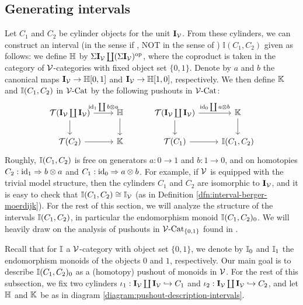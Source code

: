 \documentclass[12pt]{amsart}
\begin{document}
\subsection{Generating intervals}
Let $C_1$ and $C_2$ be cylinder objects for the unit $\mathbf{I}_\mathcal{V}$. From these cylinders, we can construct an interval (in the sense if \cite{Muro2012}, NOT in the sense of \cite{BergerMoerdijk2012}) $\mathbb{I}(C_1,C_2)$ given as follows:
we define $\mathbb{H}$ by $\Sigma\mathbf{I}_\mathcal{V} \coprod (\Sigma\mathbf{I}_\mathcal{V})^{\text{op}}$, where the coproduct is taken in the category of $\mathcal{V}$-categories with fixed object set $\{0,1\}$.
Denote by $a$ and $b$ the canonical maps $\mathbf{I}_\mathcal{V} \to \mathbb{H}[0,1] $ and $\mathbf{I}_\mathcal{V} \to \mathbb{H}[1,0]$, respectively.
We then define $\mathbb{K}$ and $\mathbb{I}(C_1,C_2)$ in $\mathcal{V}\text{-}\mathrm{Cat}$ by the following pushouts in $\mathcal{V}\text{-}\mathrm{Cat}$:
\begin{equation}\label{diagram:pushout-description-intervals}
\begin{tikzcd}
	\T(\iv \coprod \iv) \ar[d] \ar[r, "\id_1 \coprod b\otimes a"]
		& \H \ar[d]
	\\
	\T(C_2) \ar[r]
		& \K
\end{tikzcd}
\quad \quad \quad 
\begin{tikzcd}
	\T(\iv \coprod \iv) \ar[d] \ar[r, "\id_0 \coprod a\otimes b "]
		& \K \ar[d]
	\\
	\T(C_1) \ar[r]
		& \I(C_1,C_2)
\end{tikzcd}
\end{equation}
Roughly, $\mathbb{I}(C_1,C_2)$ is free on generators $a: 0 \to 1$ and $b: 1 \to 0$, and on homotopies $C_2: \mathrm{id}_1 \Rightarrow b \otimes a$ and $C_1: \mathrm{id}_0 \Rightarrow a \otimes b$.
For example, if $\mathcal{V}$ is equipped with the trivial model structure, then the cylinders $C_1$ and $C_2$ are isomorphic to $\mathbf{I}_\mathcal{V}$, and it is easy to check that $\mathbb{I}(C_1,C_2) \cong \mathbb{I}_\mathcal{V}$ (as in Definition \ref{dfn:interval-berger-moerdijk}). 
For the rest of this section, we will analyze the structure of the intervals $\mathbb{I}(C_1,C_2)$, in particular the endomorphism monoid $\mathbb{I}(C_1,C_2)_0$. 
We will heavily draw on the analysis of pushouts in $\mathcal{V}\text{-}\mathrm{Cat}_{\{0,1\}}$ found in \cite[Section 3]{BergerMoerdijk2012}.
\par
Recall that for $\mathbb{I}$ a $\mathcal{V}$-category with object set $\{0,1\}$, we denote by $\mathbb{I}_0$ and $\mathbb{I}_1$ the endomorphism monoids of the objects $0$ and $1$, respectively.
Our main goal is to describe $\mathbb{I}(C_1,C_2)_0$ as a (homotopy) pushout of monoids in $\mathcal{V}$.
For the rest of this subsection, we fix two cylinders $\iota_1 :\mathbf{I}_\mathcal{V} \coprod \mathbf{I}_\mathcal{V} \hookrightarrow C_1$ and $\iota_2: \mathbf{I}_\mathcal{V} \coprod \mathbf{I}_\mathcal{V} \hookrightarrow C_2$, and let $\mathbb{H}$ and $\mathbb{K}$ be as in diagram \eqref{diagram:pushout-description-intervals}.
\end{document}
